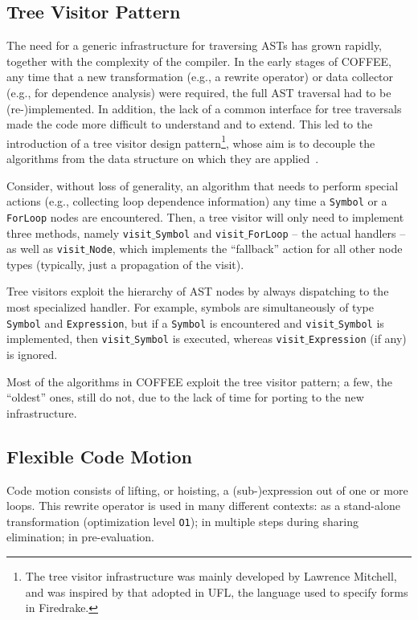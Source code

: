 \subsection{Tree Visitor Pattern}
The need for a generic infrastructure for traversing ASTs has grown rapidly, together with the complexity of the compiler. In the early stages of COFFEE, any time that a new transformation (e.g., a rewrite operator) or data collector (e.g., for dependence analysis) were required, the full AST traversal had to be (re-)implemented. In addition, the lack of a common interface for tree traversals made the code more difficult to understand and to extend. This led to the introduction of a tree visitor design pattern\footnote{The tree visitor infrastructure was mainly developed by Lawrence Mitchell, and was inspired by that adopted in UFL, the language used to specify forms in Firedrake.}, whose aim is to decouple the algorithms from the data structure on which they are applied~\cite{wiki-tree-visitors}. 

Consider, without loss of generality, an algorithm that needs to perform special actions (e.g., collecting loop dependence information) any time a \texttt{Symbol} or a \texttt{ForLoop} nodes are encountered. Then, a tree visitor will only need to implement three methods, namely \texttt{visit$\_$Symbol} and \texttt{visit$\_$ForLoop} -- the actual handlers -- as well as \texttt{visit$\_$Node}, which implements the ``fallback'' action for all other node types (typically, just a propagation of the visit).

Tree visitors exploit the hierarchy of AST nodes by always dispatching to the most specialized handler. For example, symbols are simultaneously of type \texttt{Symbol} and \texttt{Expression}, but if a \texttt{Symbol} is encountered and \texttt{visit$\_$Symbol} is implemented, then \texttt{visit$\_$Symbol} is executed, whereas \texttt{visit$\_$Expression} (if any) is ignored.

Most of the algorithms in COFFEE exploit the tree visitor pattern; a few, the ``oldest'' ones, still do not, due to the lack of time for porting to the new infrastructure.

\subsection{Flexible Code Motion}
\label{sec:coffee:cm}
Code motion consists of lifting, or hoisting, a (sub-)expression out of one or more loops. This rewrite operator is used in many different contexts: as a stand-alone transformation (optimization level \texttt{O1}); in multiple steps during sharing elimination; in pre-evaluation. 

